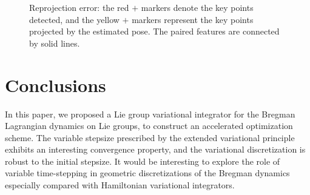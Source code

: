 \documentclass[letterpaper, 10pt, conference]{ieeeconf}
\begin{document}
\begin{figure}
    \centerline{
    }
    \centerline{
    }
    \caption{Reprojection error: the red $+$ markers denote the key points detected, and the yellow $+$ markers represent the key points projected by the estimated pose. The paired features are connected by solid lines. }\label{fig:KITTI}
\end{figure}

\section{Conclusions}

In this paper, we proposed a Lie group variational integrator for the Bregman Lagrangian dynamics on Lie groups, to construct an accelerated optimization scheme.
The variable stepsize prescribed by the extended variational principle exhibits an interesting convergence property, and the variational discretization is robust to the initial stepsize.
It would be interesting to explore the role of variable time-stepping in geometric discretizations of the Bregman dynamics especially compared with Hamiltonian variational integrators.



\end{document}
